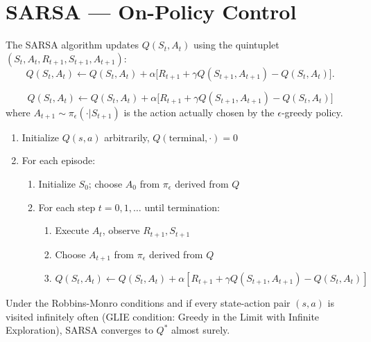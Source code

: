 \section{SARSA --- On-Policy Control}
\label{sec:sarsa}

\begin{definition}[SARSA]
The SARSA algorithm updates $Q(S_t, A_t)$ using the quintuplet
$(S_t, A_t, R_{t+1}, S_{t+1}, A_{t+1})$:
\[
    Q(S_t, A_t) \leftarrow Q(S_t, A_t) + \alpha \big[
    R_{t+1} + \gamma Q(S_{t+1}, A_{t+1}) - Q(S_t, A_t) \big].
\]
\end{definition}

\begin{keyformulas}[title=\textbf{SARSA Update}]
\[
    Q(S_t, A_t) \leftarrow Q(S_t, A_t) + \alpha \big[
    R_{t+1} + \gamma Q(S_{t+1}, A_{t+1}) - Q(S_t, A_t) \big]
\]
where $A_{t+1} \sim \pi_\epsilon(\cdot | S_{t+1})$ is the action actually
chosen by the $\epsilon$-greedy policy.
\end{keyformulas}

\begin{algorithme}[title=\textbf{SARSA}]
\begin{enumerate}
    \item Initialize $Q(s,a)$ arbitrarily, $Q(\text{terminal}, \cdot) = 0$
    \item For each episode:
    \begin{enumerate}
        \item Initialize $S_0$; choose $A_0$ from $\pi_\epsilon$ derived from $Q$
        \item For each step $t = 0, 1, \ldots$ until termination:
        \begin{enumerate}
            \item Execute $A_t$, observe $R_{t+1}, S_{t+1}$
            \item Choose $A_{t+1}$ from $\pi_\epsilon$ derived from $Q$
            \item $Q(S_t, A_t) \leftarrow Q(S_t, A_t) + \alpha[R_{t+1} + \gamma Q(S_{t+1}, A_{t+1}) - Q(S_t, A_t)]$
        \end{enumerate}
    \end{enumerate}
\end{enumerate}
\end{algorithme}

\begin{theorem}
Under the Robbins-Monro conditions and if every state-action pair $(s,a)$
is visited infinitely often (GLIE condition: Greedy in the Limit with
Infinite Exploration), SARSA converges to $Q^*$ almost surely.
\end{theorem}

